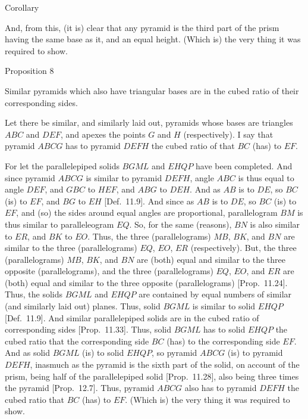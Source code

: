 \begin{center}
\large{Corollary}
\end{center}

And, from this, (it is) clear that any pyramid is the third part of the prism having the same
base as it, and an equal height. (Which is) the very thing it was required to show.


\begin{center}
{\large Proposition 8}
\end{center}

Similar pyramids which also have triangular bases are in the cubed ratio of their
corresponding sides.

Let there be similar, and similarly laid out, pyramids whose bases are triangles $ABC$ and $DEF$, and apexes
the points $G$ and $H$ (respectively). I say that pyramid $ABCG$ has to pyramid $DEFH$ the cubed ratio
of that $BC$ (has) to $EF$. 

\centerline{}

For let the parallelepiped solids $BGML$ and $EHQP$ have been completed. And since pyramid $ABCG$
is similar to pyramid $DEFH$, angle $ABC$ is thus equal to angle $DEF$, and $GBC$ to $HEF$, and $ABG$
to $DEH$. And as $AB$ is to $DE$, so $BC$ (is) to $EF$, and $BG$ to $EH$ [Def.~11.9]. 
And since as $AB$ is to $DE$, so $BC$ (is) to $EF$, and (so) the sides around equal angles are proportional, parallelogram
$BM$ is thus similar to paralleleogram $EQ$. So, for the same (reasons), $BN$ is also similar to $ER$, and $BK$
to $EO$. Thus, the three (parallelograms) $MB$, $BK$, and $BN$ are similar to the three (parallelograms) $EQ$, $EO$,
$ER$ (respectively). But, the three (parallelograms) $MB$, $BK$, and $BN$ are (both) equal and similar to the three  opposite (parallelograms),
and the three (parallelograms) $EQ$, $EO$, and $ER$ are (both) equal and similar to the three opposite
 (parallelograms) [Prop.~11.24]. Thus, the solids $BGML$ and $EHQP$ are contained by
 equal numbers of similar (and similarly laid out) planes. Thus, solid $BGML$ is similar to solid $EHQP$ [Def.~11.9].
 And similar parallelepiped solids are in the cubed ratio of corresponding sides [Prop.~11.33].
 Thus, solid $BGML$ has to solid $EHQP$ the cubed ratio that the corresponding side $BC$ (has) to the corresponding
 side $EF$. And as solid $BGML$ (is) to solid $EHQP$, so pyramid $ABCG$ (is) to pyramid
 $DEFH$, inasmuch as the pyramid is the sixth part of the solid, on account of the prism, being half of the
 parallelepiped solid [Prop.~11.28], also being three times the pyramid [Prop.~12.7].
 Thus, pyramid $ABCG$ also has to pyramid $DEFH$ the cubed ratio that $BC$ (has) to $EF$. (Which is)
 the very thing it was required to show.


